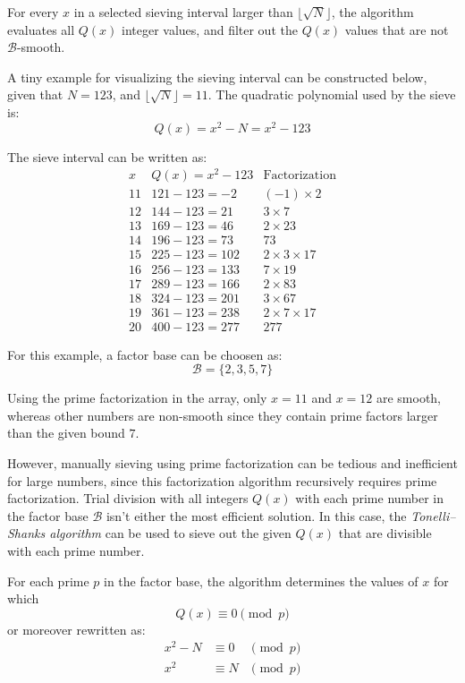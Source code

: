 \documentclass[11pt,a4paper]{article}
\begin{document}
For every $x$ in a selected sieving interval larger than $\lfloor \sqrt{N} \rfloor$, the algorithm evaluates all $Q(x)$ integer values, and filter out the $Q(x)$ values that are not $\mathcal{B}$-smooth.

A tiny example for visualizing the sieving interval can be constructed below, given that $N = 123$, and $\lfloor \sqrt{N} \rfloor = 11$. The quadratic polynomial used by the sieve is:
\[
    Q(x)=x^2-N=x^2-123
\]

The sieve interval can be written as:
\[
\begin{array}{c|c|l}
    x  & Q(x) = x^2 - 123 & \text{Factorization} \\ \hline
    11 & 121 - 123 = -2    & (-1) \times 2 \\
    12 & 144 - 123 = 21    & 3 \times 7 \\
    13 & 169 - 123 = 46    & 2 \times 23 \\
    14 & 196 - 123 = 73    & 73 \\
    15 & 225 - 123 = 102   & 2 \times 3 \times 17 \\
    16 & 256 - 123 = 133   & 7 \times 19 \\
    17 & 289 - 123 = 166   & 2 \times 83 \\
    18 & 324 - 123 = 201   & 3 \times 67 \\
    19 & 361 - 123 = 238   & 2 \times 7 \times 17 \\
    20 & 400 - 123 = 277   & 277
\end{array}
\]

For this example, a factor base can be choosen as:
\[
    \mathcal{B}=\{2,3,5,7\}
\]

Using the prime factorization in the array, only $x=11$ and $x=12$ are smooth, whereas other numbers are non-smooth since they contain prime factors larger than the given bound $7$.

However, manually sieving using prime factorization can be tedious and inefficient for large numbers, since this factorization algorithm recursively requires prime factorization. Trial division with all integers $Q(x)$ with each prime number in the factor base $\mathcal{B}$ isn't either the most efficient solution. In this case, the \emph{Tonelli--Shanks algorithm} can be used to sieve out the given $Q(x)$ that are divisible with each prime number.

For each prime $p$ in the factor base, the algorithm determines the values of $x$ for which
\[
Q(x)\equiv0\pmod p
\]
or moreover rewritten as:
\[
\begin{aligned}
    x^2 - N &\equiv 0 &\pmod{p}\\
    x^2 &\equiv N &\pmod{p}
\end{aligned}
\]
\end{document}
